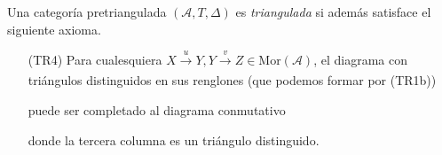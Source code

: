 \documentclass[tesis]{subfiles}
\begin{document}
\begin{Def}
\begin{itemize}
    \end{itemize}

    \noindent Una categoría pretriangulada $(\mathscr{A},T,\Delta)$ es \emph{triangulada} si además satisface el siguiente axioma.

    \begin{itemize}

    \item[(TR4)] Para cualesquiera $X\xrightarrow[]{u}Y, Y\xrightarrow[]{v}Z\in\text{Mor}(\mathscr{A})$, el diagrama con triángulos distinguidos en sus renglones (que podemos formar por (TR1b))
            \begin{center}
            \end{center}
            puede ser completado al diagrama conmutativo
            \begin{center}
            \end{center}
            donde la tercera columna es un triángulo distinguido.
    \end{itemize}
\end{Def}
\end{document}
